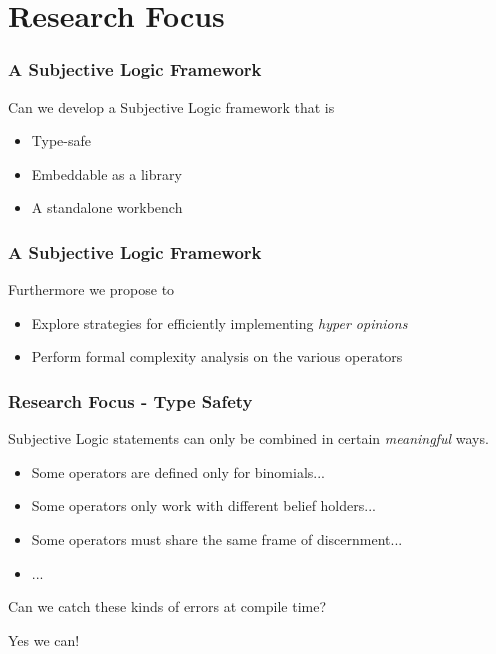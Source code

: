 \documentclass{beamer}
\begin{document}

\section{Research Focus}

\begin{frame}
\frametitle{A Subjective Logic Framework}

Can we develop a Subjective Logic framework that is

\begin{itemize}
  \item Type-safe
  \item Embeddable as a library
  \item A standalone workbench
\end{itemize}

\end{frame}

\begin{frame}
\frametitle{A Subjective Logic Framework}

Furthermore we propose to

\begin{itemize}
  \item Explore strategies for efficiently implementing \emph{hyper opinions}
  \item Perform formal complexity analysis on the various operators
\end{itemize}

\end{frame}

\begin{frame}
\frametitle{Research Focus - Type Safety}

Subjective Logic statements can only be combined in certain \emph{meaningful} ways.

\begin{itemize}
  \item Some operators are defined only for binomials...
  \item Some operators only work with different belief holders...
  \item Some operators must share the same frame of discernment...
  \item ...
\end{itemize}

Can we catch these kinds of errors at compile time?

\pause

Yes we can!

\end{frame}
\end{document}
